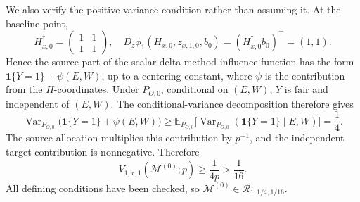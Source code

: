We also verify the positive-variance condition rather than assuming it.  At the baseline point,
\[
H_{x,0}^{\dagger}=
\begin{pmatrix}1&1\\1&1\end{pmatrix},
\quad
D_z\phi_1(H_{x,0},z_{x,1,0},b_0)
=(H_{x,0}^{\dagger}b_0)^{\top}=(1,1).
\]
Hence the source part of the scalar delta-method influence function has the form
\(\mathbf 1\{Y=1\}+\psi(E,W)\), up to a centering constant, where \(\psi\) is the contribution from the \(H\)-coordinates.  Under \(P_{O,0}\), conditional on \((E,W)\), \(Y\) is fair and independent of \((E,W)\).  The conditional-variance decomposition therefore gives
\[
\operatorname{Var}_{P_{O,0}}
 \bigl(\mathbf 1\{Y=1\}+\psi(E,W)\bigr)
\ge
\mathbb E_{P_{O,0}}
 \bigl[\operatorname{Var}_{P_{O,0}}(\mathbf 1\{Y=1\}\mid E,W)\bigr]
=\frac14.
\]
The source allocation multiplies this contribution by \(p^{-1}\), and the independent target contribution is nonnegative.  Therefore
\[
V_{1,x,1}(\mathcal M^{(0)};p)\ge\frac1{4p}>\frac1{16}.
\]
All defining conditions have been checked, so
\(\mathcal M^{(0)}\in\mathcal R_{1,1/4,1/16}\).

